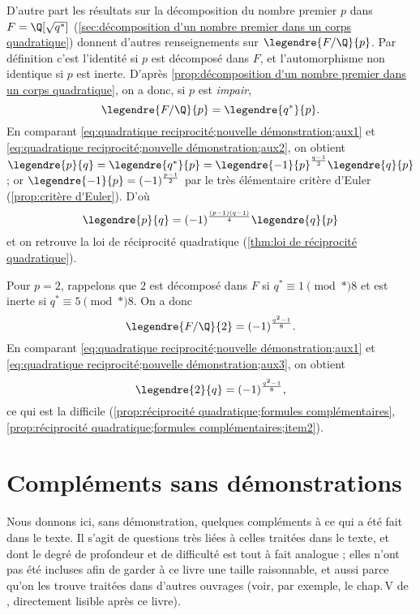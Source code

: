\documentclass[11pt, %
  title in boldface,
  theorem in new line,
  theorem numbering = section,
  number theorems separately,
  simple name,
]{beaulivre}
\begin{document}
    D'autre part les résultats sur la décomposition du nombre premier \( p \) dans \( F = \Q[\sqrt{q^*}] \) (\cref{sec:décomposition d'un nombre premier dans un corps quadratique}) donnent d'autres renseignements sur \( \legendre{F/\Q}{p} \). Par définition c'est l'identité si \( p \) est décomposé dans \( F \), et l'automorphisme non identique si \( p \) est inerte. D'après \cref{prop:décomposition d'un nombre premier dans un corps quadratique}, on a donc, si \( p \) est \emph{impair},
    \begin{equation}\label{eq:quadratique reciprocité;nouvelle démonstration;aux2}
        \legendre{F/\Q}{p} = \legendre{q^*}{p}.
    \end{equation}
    En comparant \eqref{eq:quadratique reciprocité;nouvelle démonstration;aux1} et \eqref{eq:quadratique reciprocité;nouvelle démonstration;aux2}, on obtient \( \legendre{p}{q} = \legendre{q^*}{p} = \legendre{-1}{p}^{\frac{q-1}{2}} \legendre{q}{p} \) ; or \( \legendre{-1}{p} = (-1)^{\frac{p-1}{2}} \) par le très élémentaire critère d'Euler (\cref{prop:critère d'Euler}). D'où
    \[
        \legendre{p}{q} = (-1)^{\frac{(p-1)(q-1)}{4}} \legendre{q}{p}
    \]
    et on retrouve la loi de réciprocité quadratique (\cref{thm:loi de réciprocité quadratique}).

    Pour \( p = 2 \), rappelons que \( 2 \) est décomposé dans \( F \) si \( q^* \equiv 1 \pmod*{8} \) et est inerte si \( q^* \equiv 5 \pmod*{8} \). On a donc
    \begin{equation}\label{eq:quadratique reciprocité;nouvelle démonstration;aux3}
        \legendre{F/\Q}{2} = (-1)^{\frac{q^2-1}{8}}.
    \end{equation}
    En comparant \eqref{eq:quadratique reciprocité;nouvelle démonstration;aux1} et \eqref{eq:quadratique reciprocité;nouvelle démonstration;aux3}, on obtient
    \[
        \legendre{2}{q} = (-1)^{\frac{q^2-1}{8}},
    \]
    ce qui est la  difficile (\cref{prop:réciprocité quadratique;formules complémentaires}, \ref{prop:réciprocité quadratique;formules complémentaires;item2}).



\cleardoublepage
{}
{}
\chapter*{Compléments sans démonstrations}

Nous donnons ici, sans démonstration, quelques compléments à ce qui a été fait dans le texte. Il s'agit de questions très liées à celles traitées dans le texte, et dont le degré de profondeur et de difficulté est tout à fait analogue ; elles n'ont pas été incluses afin de garder à ce livre une taille raisonnable, et aussi parce qu'on les trouve traitées dans d'autres ouvrages (voir, par exemple, le chap.\,V de \cite{zariski1958}, directement lisible après ce livre).
\end{document}
